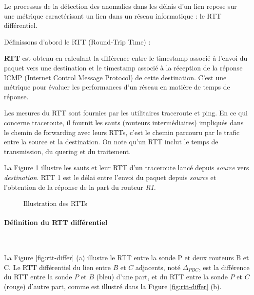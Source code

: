 Le processus de la détection des anomalies dans les délais d'un lien repose sur une métrique caractérisant un lien dans un réseau informatique : le RTT différentiel.

Définissons d'abord le  RTT (Round-Trip Time) :
\begin{tcolorbox}
	\textbf{RTT} est obtenu en calculant la différence entre le timestamp associé à l'envoi du paquet vers une destination  et le timestamp associé à la réception de la réponse ICMP (Internet Control Message Protocol) de cette destination. C'est une métrique pour évaluer les performances d'un réseau en matière de temps de réponse. 
\end{tcolorbox}
Les mesures du RTT sont fournies par les utilitaires traceroute et ping. En ce qui concerne traceroute,  il fournit les sauts (routeurs intermédiaires) impliqués dans le  chemin de forwarding avec leurs RTTs, c'est le chemin parcouru par le trafic entre la source et la destination. On note qu'un  RTT inclut le temps de transmission, du quering et  du traitement. 

La Figure 	\ref{fig:traceroute_illustrate_RTT_1} illustre les sauts et leur RTT  d'un traceroute lancé depuis \textit{source} vers \textit{destination}. RTT 1 est le délai entre l'envoi du paquet depuis \textit{source} et l'obtention de la réponse de la part du routeur \textit{R1}.
\begin{figure}[h]
	\centering
	\resizebox{\textwidth}{!}{
	\captionsetup{justification=centering}
	
    }
	\caption{Illustration des RTTs }
	\label{fig:traceroute_illustrate_RTT_1}
\end{figure}
\paragraph{Définition du RTT différentiel }~

La Figure 	\ref{fig:rtt-differ} (a)  illustre le RTT entre la sonde P et deux routeurs B et C. Le RTT différentiel  du lien entre  $B$ et $C$ adjacents, noté $\Delta_{PBC}$, est la différence du RTT entre la sonde $P$ et $B$ (bleu) d'une part, et du RTT entre la sonde $P$ et $C$  (rouge) d'autre part, comme est  illustré dans la Figure	\ref{fig:rtt-differ} (b). 

